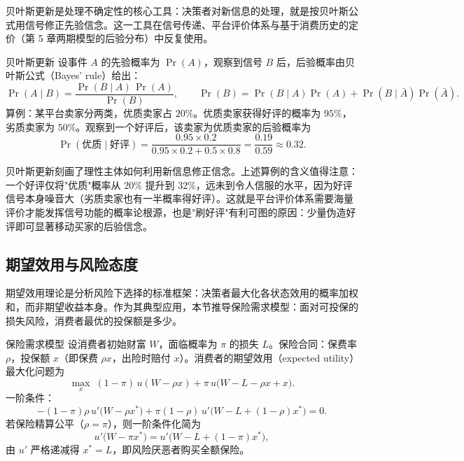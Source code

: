 贝叶斯更新是处理不确定性的核心工具：决策者对新信息的处理，就是按贝叶斯公式用信号修正先验信念。这一工具在信号传递、平台评价体系与基于消费历史的定价（第 5 章两期模型的后验分布）中反复使用。

\begin{derivation}{贝叶斯更新}{}
设事件 $A$ 的先验概率为 $\Pr(A)$，观察到信号 $B$ 后，后验概率由贝叶斯公式（Bayes' rule）给出：
\[
\Pr(A \mid B) = \frac{\Pr(B \mid A)\,\Pr(A)}{\Pr(B)}, \qquad
\Pr(B) = \Pr(B \mid A)\Pr(A) + \Pr(B \mid \bar A)\Pr(\bar A).
\]
算例：某平台卖家分两类，优质卖家占 $20\%$。优质卖家获得好评的概率为 $95\%$，劣质卖家为 $50\%$。观察到一个好评后，该卖家为优质卖家的后验概率为
\[
\Pr(\text{优质} \mid \text{好评}) = \frac{0.95 \times 0.2}{0.95 \times 0.2 + 0.5 \times 0.8} = \frac{0.19}{0.59} \approx 0.32.
\]
\end{derivation}

贝叶斯更新刻画了理性主体如何利用新信息修正信念。上述算例的含义值得注意：一个好评仅将"优质"概率从 $20\%$ 提升到 $32\%$，远未到令人信服的水平，因为好评信号本身噪音大（劣质卖家也有一半概率得好评）。这就是平台评价体系需要海量评价才能发挥信号功能的概率论根源，也是"刷好评"有利可图的原因：少量伪造好评即可显著移动买家的后验信念。

\subsection{期望效用与风险态度}

期望效用理论是分析风险下选择的标准框架：决策者最大化各状态效用的概率加权和，而非期望收益本身。作为其典型应用，本节推导保险需求模型：面对可投保的损失风险，消费者最优的投保额是多少。

\begin{derivation}{保险需求模型}{}
设消费者初始财富 $W$，面临概率为 $\pi$ 的损失 $L$。保险合同：保费率 $\rho$，投保额 $x$（即保费 $\rho x$，出险时赔付 $x$）。消费者的期望效用（expected utility）最大化问题为
\[
\max_x \; (1-\pi)\, u(W - \rho x) + \pi\, u\bigl(W - L - \rho x + x\bigr).
\]
一阶条件：
\[
-(1-\pi)\rho\, u'\bigl(W - \rho x^*\bigr) + \pi(1-\rho)\, u'\bigl(W - L + (1-\rho) x^*\bigr) = 0.
\]
若保险精算公平（$\rho = \pi$），则一阶条件化简为
\[
u'\bigl(W - \pi x^*\bigr) = u'\bigl(W - L + (1-\pi) x^*\bigr),
\]
由 $u'$ 严格递减得 $x^* = L$，即风险厌恶者购买全额保险。
\end{derivation}

